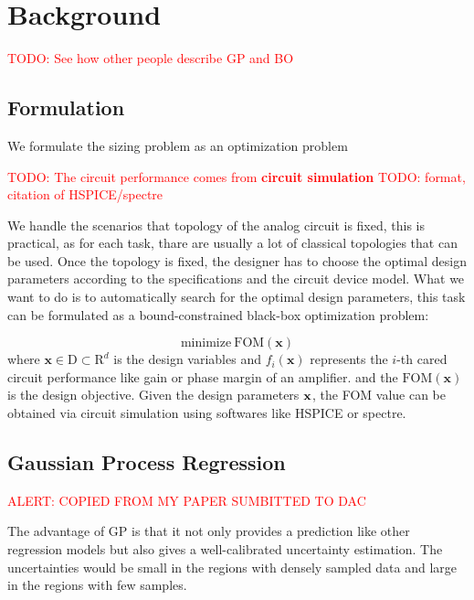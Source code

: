 \section{Background}

\textcolor{red}{TODO: See how other people describe GP and BO}

\subsection{Formulation}

We formulate the sizing problem as an optimization problem

\textcolor{red}{TODO: The circuit performance comes from \bf{circuit} simulation}
\textcolor{red}{TODO: format, citation of HSPICE/spectre}

We handle the scenarios that topology of the analog circuit is fixed, this is
practical, as for each task, thare are usually a lot of classical topologies
that can be used. Once the topology is fixed, the designer has to choose the
optimal design parameters according to the specifications and the circuit
device model. What we want to do is to automatically search for the optimal
design parameters, this task can be formulated as a bound-constrained black-box optimization problem:

\begin{equation}
    \label{eq:MOFormulation}
    \text{minimize}~\mathrm{FOM}(\mathbf{x})
\end{equation}
where $\mathbf{x} \in \textrm{D} \subset \textrm{R}^d$ is the design variables
and $f_i(\mathbf{x})$ represents the $i$-th cared circuit performance like gain
or phase margin of an amplifier. and the $\mathrm{FOM}(\mathbf{x})$ is the
design objective. Given the design parameters $\bf{x}$, the FOM value can be
obtained via circuit simulation using softwares like HSPICE or spectre.

\subsection{Gaussian Process Regression}

\textcolor{red}{ALERT: COPIED FROM MY PAPER SUMBITTED TO DAC}

The advantage of GP is that it not only provides a prediction like other
regression models but also gives a well-calibrated uncertainty estimation. The
uncertainties would be small in the regions with densely sampled data and large
in the regions with few samples.

